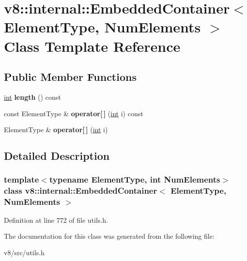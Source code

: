 \hypertarget{classv8_1_1internal_1_1EmbeddedContainer}{}\section{v8\+:\+:internal\+:\+:Embedded\+Container$<$ Element\+Type, Num\+Elements $>$ Class Template Reference}
\label{classv8_1_1internal_1_1EmbeddedContainer}
\subsection*{Public Member Functions}
\begin{DoxyCompactItemize}
\item 
\mbox{\label{classv8_1_1internal_1_1EmbeddedContainer_aa74e56743da63c31ad13a7d7d6bb3da4}} 
\mbox{\hyperlink{classint}{int}} {\bfseries length} () const
\item 
\mbox{\label{classv8_1_1internal_1_1EmbeddedContainer_ae17a44ada90bb43ff224c89d6245f2ed}} 
const Element\+Type \& {\bfseries operator\mbox{[}$\,$\mbox{]}} (\mbox{\hyperlink{classint}{int}} i) const
\item 
\mbox{\label{classv8_1_1internal_1_1EmbeddedContainer_a30ea902e600baaf5e21457d790102f8f}} 
Element\+Type \& {\bfseries operator\mbox{[}$\,$\mbox{]}} (\mbox{\hyperlink{classint}{int}} i)
\end{DoxyCompactItemize}


\subsection{Detailed Description}
\subsubsection*{template$<$typename Element\+Type, int Num\+Elements$>$\newline
class v8\+::internal\+::\+Embedded\+Container$<$ Element\+Type, Num\+Elements $>$}



Definition at line 772 of file utils.\+h.



The documentation for this class was generated from the following file\+:\begin{DoxyCompactItemize}
\item 
v8/src/utils.\+h\end{DoxyCompactItemize}
